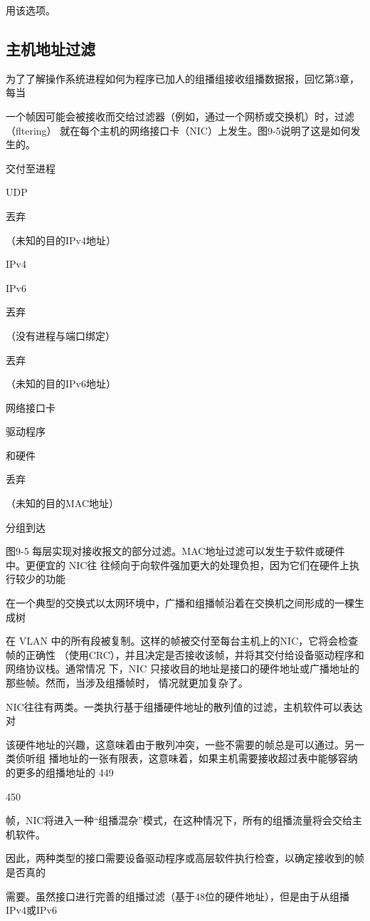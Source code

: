 用该选项。

\subsection{主机地址过滤}
为了了解操作系统进程如何为程序已加人的组播组接收组播数据报，回忆第3章，每当

一个帧因可能会被接收而交给过滤器（例如，通过一个网桥或交换机）时，过滤（fltering）
就在每个主机的网络接口卡（NIC）上发生。图9-5说明了这是如何发生的。

交付至进程

UDP

丟弃

（未知的目的IPv4地址）

IPv4

IPv6

丟弃

（没有进程与端口绑定）

丟弃

（未知的目的IPv6地址）

网络接口卡

驱动程序

和硬件

丢弃

（未知的目的MAC地址）

分组到达

图9-5 每层实现对接收报文的部分过滤。MAC地址过滤可以发生于软件或硬件中。更便宜的 NIC往
往倾向于向软件强加更大的处理负担，因为它们在硬件上执行较少的功能

在一个典型的交换式以太网环境中，广播和组播帧沿着在交换机之间形成的一棵生成树

在 VLAN 中的所有段被复制。这样的帧被交付至每台主机上的NIC，它将会检查帧的正确性
（使用CRC），并且决定是否接收该帧，并将其交付给设备驱动程序和网络协议栈。通常情况
下，NIC 只接收目的地址是接口的硬件地址或广播地址的那些帧。然而，当涉及组播帧时，
情况就更加复杂了。

NIC往往有两类。一类执行基于组播硬件地址的散列值的过滤，主机软件可以表达对

该硬件地址的兴趣，这意味着由于散列冲突，一些不需要的帧总是可以通过。另一类侦听组
播地址的一张有限表，这意味着，如果主机需要接收超过表中能够容纳的更多的组播地址的
449

450

帧，NIC将进入一种“组播混杂”模式，在这种情况下，所有的组播流量将会交给主机软件。

因此，两种类型的接口需要设备驱动程序或高层软件执行检查，以确定接收到的帧是否真的

需要。虽然接口进行完善的组播过滤（基于48位的硬件地址），但是由于从组播IPv4或IPv6

